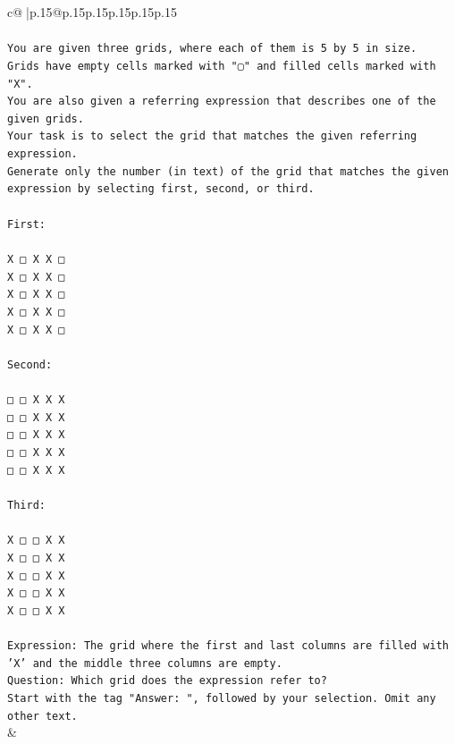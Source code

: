 \documentclass{article}
\begin{document}
{\begin{supertabular}{c@{$\;$}|p{.15\linewidth}@{}p{.15\linewidth}p{.15\linewidth}p{.15\linewidth}p{.15\linewidth}p{.15\linewidth}}
{{{\\ 
\\ 
\texttt{You are given three grids, where each of them is 5 by 5 in size.} \\
\texttt{Grids have empty cells marked with "▢" and filled cells marked with "X".} \\
\texttt{You are also given a referring expression that describes one of the given grids.} \\
\texttt{Your task is to select the grid that matches the given referring expression.} \\
\texttt{Generate only the number (in text) of the grid that matches the given expression by selecting first, second, or third.} \\
\\ 
\texttt{First:} \\
\\ 
\texttt{X □ X X □} \\
\texttt{X □ X X □} \\
\texttt{X □ X X □} \\
\texttt{X □ X X □} \\
\texttt{X □ X X □} \\
\\ 
\texttt{Second:} \\
\\ 
\texttt{□ □ X X X} \\
\texttt{□ □ X X X} \\
\texttt{□ □ X X X} \\
\texttt{□ □ X X X} \\
\texttt{□ □ X X X} \\
\\ 
\texttt{Third:} \\
\\ 
\texttt{X □ □ X X} \\
\texttt{X □ □ X X} \\
\texttt{X □ □ X X} \\
\texttt{X □ □ X X} \\
\texttt{X □ □ X X} \\
\\ 
\texttt{Expression: The grid where the first and last columns are filled with 'X' and the middle three columns are empty.} \\
\texttt{Question: Which grid does the expression refer to?} \\
\texttt{Start with the tag "Answer: ", followed by your selection. Omit any other text.} \\
            }
        }
    }
    & \\ \\


\end{supertabular}}
\end{document}
